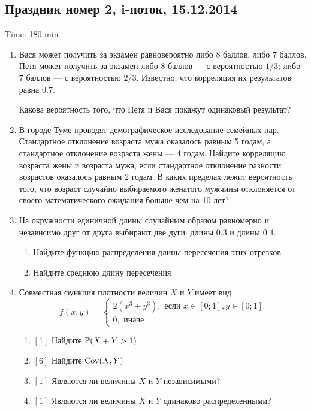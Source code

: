 \documentclass[12pt, a4paper]{article}\usepackage[]{graphicx}\usepackage[]{color}
\begin{document}
				\subsection{Праздник номер 2, i-поток, 15.12.2014}

				Time: 180 min

				\begin{enumerate}
					\item Вася может получить за экзамен равновероятно либо $8$ баллов, либо $7$ баллов. Петя может получить за экзамен либо $8$ баллов — с вероятностью $1/3$; либо $7$ баллов — с вероятностью $2/3$. Известно, что корреляция их результатов равна $0.7$.

					Какова вероятность того, что Петя и Вася покажут одинаковый результат?

					\item В  городе Туме проводят демографическое исследование семейных пар. Стандартное отклонение возраста мужа оказалось равным 5 годам, а стандартное отклонение возраста жены — 4 годам. Найдите корреляцию возраста жены и возраста мужа, если стандартное отклонение разности возрастов оказалось равным 2 годам. В каких пределах лежит вероятность того, что возраст случайно выбираемого женатого мужчины отклоняется от своего математического ожидания больше чем на 10 лет?


					\item На окружности единичной длины случайным образом равномерно и независимо друг от друга выбирают две дуги: длины $0.3$ и длины $0.4$.
					\begin{enumerate}
						\item  Найдите функцию распределения длины пересечения этих отрезков
						\item Найдите среднюю длину пересечения
					\end{enumerate}


					\item  Совместная функция плотности величин $X$ и $Y$ имеет вид
					\begin{equation}
					\nonumber
					f(x,y)=\begin{cases}
					2(x^3+y^3), \text{ если } x\in [0;1], y\in [0;1] \\
					0, \mbox{ иначе}
					\end{cases}
					\end{equation}
					\begin{enumerate}
						\item $[1]$ Найдите $\P(X+Y>1)$
						\item $[6]$ Найдите $\Cov(X,Y)$
						\item $[1]$ Являются ли величины $X$ и $Y$ независимыми?
						\item $[1]$ Являются ли величины $X$ и $Y$ одинаково распределенными?
					\end{enumerate}




\end{enumerate}
\end{document}
